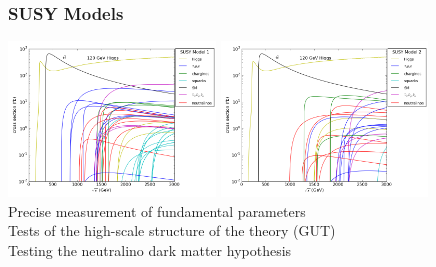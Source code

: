 \documentclass{beamer}
\begin{document}
\begin{frame}
\frametitle{SUSY Models}
\includegraphics[width=5.5cm]{../SIDWorkshop/susy_model1.png}
\includegraphics[width=5.5cm]{../SIDWorkshop/susy_model2.png}\\
Precise measurement of fundamental parameters\\
Tests of the high-scale structure of the theory (GUT)\\
Testing the neutralino dark matter hypothesis
\end{frame}
\end{document}
